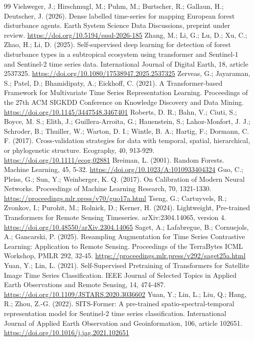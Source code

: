 \documentclass[11pt,a4paper]{article}
\begin{document}
\begin{thebibliography}{99}
\small
{} Viehweger, J.; Hirschmugl, M.; Puhm, M.; Burtscher, R.; Gallaun, H.; Deutscher, J. (2026). Dense labelled time-series for mapping European forest disturbance agents. Earth System Science Data Discussions, preprint under review. \url{https://doi.org/10.5194/essd-2026-185}
 Zhang, M.; Li, G.; Lu, D.; Xu, C.; Zhao, H.; Li, D. (2025). Self-supervised deep learning for detection of forest disturbance types in a subtropical ecosystem using transformer and Sentinel-1 and Sentinel-2 time series data. International Journal of Digital Earth, 18, article 2537325. \url{https://doi.org/10.1080/17538947.2025.2537325}
 Zerveas, G.; Jayaraman, S.; Patel, D.; Bhamidipaty, A.; Eickhoff, C. (2021). A Transformer-based Framework for Multivariate Time Series Representation Learning. Proceedings of the 27th ACM SIGKDD Conference on Knowledge Discovery and Data Mining. \url{https://doi.org/10.1145/3447548.3467401}
 Roberts, D. R.; Bahn, V.; Ciuti, S.; Boyce, M. S.; Elith, J.; Guillera-Arroita, G.; Hauenstein, S.; Lahoz-Monfort, J. J.; Schroder, B.; Thuiller, W.; Warton, D. I.; Wintle, B. A.; Hartig, F.; Dormann, C. F. (2017). Cross-validation strategies for data with temporal, spatial, hierarchical, or phylogenetic structure. Ecography, 40, 913-929. \url{https://doi.org/10.1111/ecog.02881}
 Breiman, L. (2001). Random Forests. Machine Learning, 45, 5-32. \url{https://doi.org/10.1023/A:1010933404324}
 Guo, C.; Pleiss, G.; Sun, Y.; Weinberger, K. Q. (2017). On Calibration of Modern Neural Networks. Proceedings of Machine Learning Research, 70, 1321-1330. \url{https://proceedings.mlr.press/v70/guo17a.html}
 Tseng, G.; Cartuyvels, R.; Zvonkov, I.; Purohit, M.; Rolnick, D.; Kerner, H. (2024). Lightweight, Pre-trained Transformers for Remote Sensing Timeseries. arXiv:2304.14065, version 4. \url{https://doi.org/10.48550/arXiv.2304.14065}
 Saget, A.; Lafabregue, B.; Cornuejols, A.; Gancarski, P. (2025). Resampling Augmentation for Time Series Contrastive Learning: Application to Remote Sensing. Proceedings of the TerraBytes ICML Workshop, PMLR 292, 32-45. \url{https://proceedings.mlr.press/v292/saget25a.html}
 Yuan, Y.; Lin, L. (2021). Self-Supervised Pretraining of Transformers for Satellite Image Time Series Classification. IEEE Journal of Selected Topics in Applied Earth Observations and Remote Sensing, 14, 474-487. \url{https://doi.org/10.1109/JSTARS.2020.3036602}
 Yuan, Y.; Lin, L.; Liu, Q.; Hang, R.; Zhou, Z.-G. (2022). SITS-Former: A pre-trained spatio-spectral-temporal representation model for Sentinel-2 time series classification. International Journal of Applied Earth Observation and Geoinformation, 106, article 102651. \url{https://doi.org/10.1016/j.jag.2021.102651}

\end{thebibliography}
\end{document}
